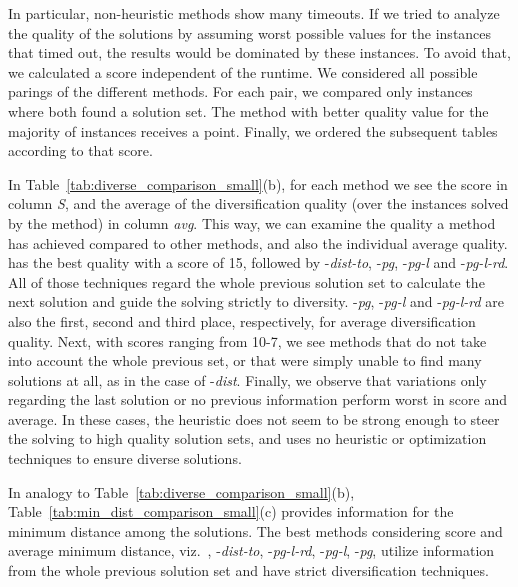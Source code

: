In particular, non-heuristic methods show many timeouts. 
If we tried to analyze the quality of the solutions by assuming worst possible values for the instances that timed out,
the results would be dominated by these instances. 
To avoid that, we calculated a score independent of the runtime.
We considered all possible parings of the different methods. 
For each pair, we compared only instances where both found a solution set.
The method with better quality value for the majority of instances receives a point. 
Finally, we ordered the subsequent tables according to that score. 
 
In Table~\ref{tab:diverse_comparison_small}(b), for each method we see the score in column \textit{S}, and 
the average of the diversification quality (over the instances solved by the method) in column \textit{avg}. 
This way, we can examine the quality a method has achieved compared to other methods, and also the individual average quality.
 has the best quality with a score of 15, followed by -\textit{dist-to}, -\textit{pg}, -\textit{pg-l} and -\textit{pg-l-rd}.
All of those techniques regard the whole previous solution set to calculate the next solution
and guide the solving strictly to diversity.
-\textit{pg}, -\textit{pg-l} and -\textit{pg-l-rd } are also the first, second and third place, respectively, for average diversification quality. 
Next, with scores ranging from 10-7, we see  methods 
that do not take into account the whole previous set, 
or that were simply unable to find many solutions at all, as in the case of -\textit{dist}. 
Finally, we observe that  variations only regarding the last solution or no previous information 
perform worst in score and average. 
In these cases, the heuristic does not seem to be strong enough to steer the solving to high quality solution sets, 
and  uses no heuristic or optimization techniques to ensure diverse solutions.

In analogy to Table~\ref{tab:diverse_comparison_small}(b),
Table~\ref{tab:min_dist_comparison_small}(c) provides information for the minimum distance among the solutions. 
%
%
The best methods considering score and average minimum distance, 
viz.\ , -\textit{dist-to}, -\textit{pg-l-rd}, -\textit{pg-l}, -\textit{pg}, utilize information from the whole
previous solution set and have strict diversification techniques. 

